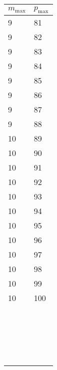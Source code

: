 \begin{table}
\begin{tabular}{ll}
   \hline
   \end{tabular}
   \begin{tabular}{ll}
   \hline
   $m_{\text{max}}$ & $p_{\text{max}}$ \\
   \hline
9 & 81 \\
9 & 82 \\
9 & 83 \\
9 & 84 \\
9 & 85 \\
9 & 86 \\
9 & 87 \\
9 & 88 \\
10 & 89 \\
10 & 90 \\
10 & 91 \\
10 & 92 \\
10 & 93 \\
10 & 94 \\
10 & 95 \\
10 & 96 \\
10 & 97 \\
10 & 98 \\
10 & 99 \\
10 & 100 \\
   \hline
   \\
   \\
   \\
   \\
   \\
   \\
   \\
   \\
   \\
   \\
   \\
   \\
   \\
   \\
   \\
   \\
   \\
   \\
   \\
   \\
   \end{tabular}
\end{table}  


